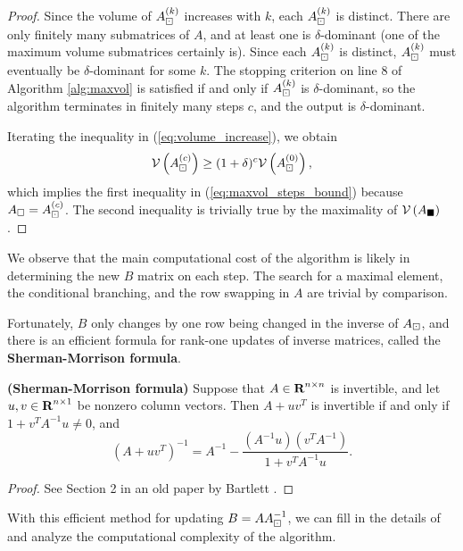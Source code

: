 \documentclass{article}
\begin{document}
\begin{proof}
	 	Since the volume of $A_\boxdot^{(k)}$ increases with $k$, each $A_\boxdot^{(k)}$ is distinct. There are only finitely many submatrices of $A$, and at least one is $\delta$-dominant (one of the maximum volume submatrices certainly is). Since each $A_\boxdot^{(k)}$ is distinct, $A_\boxdot^{(k)}$ must eventually be $\delta$-dominant for some $k$. The stopping criterion on line 8 of Algorithm \ref{alg:maxvol} is satisfied if and only if $A_\boxdot^{(k)}$ is $\delta$-dominant, so the algorithm terminates in finitely many steps $c$, and the output is $\delta$-dominant.
	 	
	 	Iterating the inequality in (\ref{eq:volume_increase}), we obtain
	 	\begin{equation}
	 		\mathcal{V}\left(A_\boxdot^{(c)}\right) \ge (1+\delta)^c\mathcal{V}\left(A_\boxdot^{(0)}\right),
	 	\end{equation}
	 	which implies the first inequality in (\ref{eq:maxvol_steps_bound}) because $A_\square = A_\boxdot^{(c)}$. The second inequality is trivially true by the maximality of $\mathcal{V}\left(A_\blacksquare\right)$.
	\end{proof}
	
	We observe that the main computational cost of the \maxvol{} algorithm is likely in determining the new $B$ matrix on each step. The search for a maximal element, the conditional branching, and the row swapping in $A$ are trivial by comparison.
	
	Fortunately, $B$ only changes by one row being changed in the inverse of $A_\boxdot$, and there is an efficient formula for rank-one updates of inverse matrices, called the \textbf{Sherman-Morrison formula}.
	
	\begin{lem} \textnormal{\bf(Sherman-Morrison formula)}
		\label{lem:sherman_morrison}
		Suppose that $A \in \textnormal{\bf R}^{n\times n}$ is invertible, and let $u,v\in\textnormal{\bf R}^{n\times 1}$ be nonzero column vectors. Then $A + uv^T$ is invertible if and only if $1 + v^TA^{-1}u \ne 0$, and
		\begin{equation}
			\left(A+ uv^T\right)^{-1} = A^{-1} - \frac{\left(A^{-1}u\right)\left(v^TA^{-1}\right)}{1 + v^TA^{-1}u}.
		\end{equation}
	\end{lem}
	
	\begin{proof}
		See Section 2 in an old paper by Bartlett \cite{bartlett_1951}.
	\end{proof}
	
	With this efficient method for updating $B = AA_\boxdot^{-1}$, we can fill in the details of \maxvol{} and analyze the computational complexity of the algorithm.
	
\end{document}
